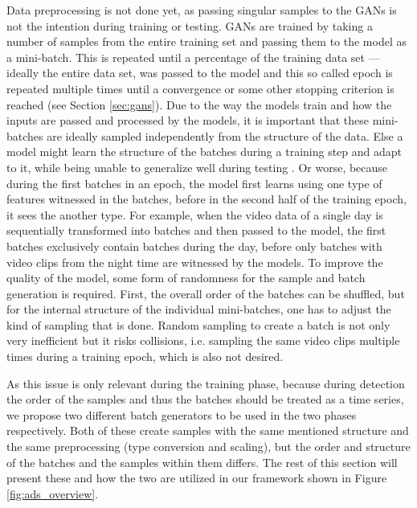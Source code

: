Data preprocessing is not done yet, as passing singular samples to the GANs is not the intention during training or testing. GANs are trained by taking a number of samples from the entire training set and passing them to the model as a mini-batch. This is repeated until a percentage of the training data set --- ideally the entire data set,  was passed to the model and this so called epoch is repeated multiple times until a convergence or some other stopping criterion is reached (see Section \ref{sec:gans}). Due to the way the models train and how the inputs are passed and processed by the models, it is important that these mini-batches are ideally sampled independently from the structure of the data. Else a model might learn the structure of the batches during a training step and adapt to it, while being unable to generalize well during testing \cite{bengio2012practical}. Or worse, because during the first batches in an epoch, the model first learns using one type of features witnessed in the batches, before in the second half of the training epoch, it sees the another type. For example, when the video data of a single day is sequentially transformed into batches and then passed to the model, the first batches exclusively contain batches during the day, before only batches with video clips from the night time are witnessed by the models. To improve the quality of the model, some form of randomness for the sample and batch generation is required. First, the overall order of the batches can be shuffled, but for the internal structure of the individual mini-batches, one has to adjust the kind of sampling that is done. Random sampling to create a batch is not only very inefficient but it risks collisions, i.e. sampling the same video clips multiple times during a training epoch, which is also not desired.

As this issue is only relevant during the training phase, because during detection the order of the samples and thus the batches should be treated as a time series, we propose two different batch generators to be used in the two phases respectively. Both of these create samples with the same mentioned structure and the same preprocessing (type conversion and scaling), but the order and structure of the batches and the samples within them differs. The rest of this section will present these and how the two are utilized in our framework shown in Figure \ref{fig:ads_overview}.

